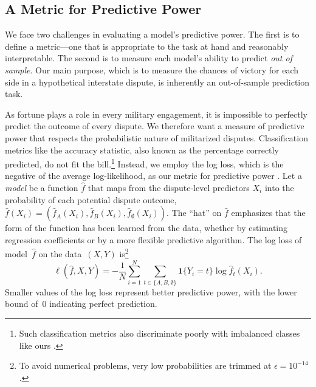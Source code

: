 \subsection{A Metric for Predictive Power}

We face two challenges in evaluating a model's predictive power.
The first is to define a metric---one that is appropriate to the task at hand and reasonably interpretable.
The second is to measure each model's ability to predict \emph{out of sample}.
Our main purpose, which is to measure the chances of victory for each side in a hypothetical interstate dispute, is inherently an out-of-sample prediction task.

As fortune plays a role in every military engagement, it is impossible to perfectly predict the outcome of every dispute.
We therefore want a measure of predictive power that respects the probabilistic nature of militarized disputes.
Classification metrics like the accuracy statistic, also known as the percentage correctly predicted, do not fit the bill.\footnote{%
   Such classification metrics also discriminate poorly with imbalanced classes like ours \citep[420--423]{kuhn}.
}
Instead, we employ the log loss, which is the negative of the average log-likelihood, as our metric for predictive power \citep[221]{Hastie:2009wpa}.
Let a \emph{model} be a function $\hat{f}$ that maps from the dispute-level predictors $X_i$ into the probability of each potential dispute outcome, $\hat{f}(X_i) = (\hat{f}_A(X_i), \hat{f}_B(X_i), \hat{f}_{\emptyset}(X_i))$.
The ``hat'' on $\hat{f}$ emphasizes that the form of the function has been learned from the data, whether by estimating regression coefficients or by a more flexible predictive algorithm.
The log loss of model~$\hat{f}$ on the data~$(X, Y)$ is\footnote{%
  To avoid numerical problems, very low probabilities are trimmed at $\epsilon = 10^{-14}$.
}
\begin{equation}
  \label{eq:log-loss}
  \ell(\hat{f}, X, Y)
  =
  - \frac{1}{N} \sum_{i = 1}^{N} \sum_{t \in \{A, B, \emptyset\}}
  \mathbf{1} \{Y_i = t\} \log \hat{f}_t(X_i).
\end{equation}
Smaller values of the log loss represent better predictive power, with the lower bound of~$0$ indicating perfect prediction.

